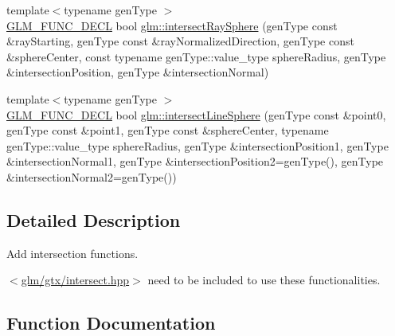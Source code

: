 \begin{DoxyCompactItemize}
\item 
{\footnotesize template$<$typename gen\+Type $>$ }\\\mbox{\hyperlink{setup_8hpp_ab2d052de21a70539923e9bcbf6e83a51}{G\+L\+M\+\_\+\+F\+U\+N\+C\+\_\+\+D\+E\+CL}} bool \mbox{\hyperlink{group__gtx__intersect_gad28c00515b823b579c608aafa1100c1d}{glm\+::intersect\+Ray\+Sphere}} (gen\+Type const \&ray\+Starting, gen\+Type const \&ray\+Normalized\+Direction, gen\+Type const \&sphere\+Center, const typename gen\+Type\+::value\+\_\+type sphere\+Radius, gen\+Type \&intersection\+Position, gen\+Type \&intersection\+Normal)
\item 
{\footnotesize template$<$typename gen\+Type $>$ }\\\mbox{\hyperlink{setup_8hpp_ab2d052de21a70539923e9bcbf6e83a51}{G\+L\+M\+\_\+\+F\+U\+N\+C\+\_\+\+D\+E\+CL}} bool \mbox{\hyperlink{group__gtx__intersect_ga9c68139f3d8a4f3d7fe45f9dbc0de5b7}{glm\+::intersect\+Line\+Sphere}} (gen\+Type const \&point0, gen\+Type const \&point1, gen\+Type const \&sphere\+Center, typename gen\+Type\+::value\+\_\+type sphere\+Radius, gen\+Type \&intersection\+Position1, gen\+Type \&intersection\+Normal1, gen\+Type \&intersection\+Position2=gen\+Type(), gen\+Type \&intersection\+Normal2=gen\+Type())
\end{DoxyCompactItemize}


\subsection{Detailed Description}
Add intersection functions. 

$<$\mbox{\hyperlink{intersect_8hpp}{glm/gtx/intersect.\+hpp}}$>$ need to be included to use these functionalities. 

\subsection{Function Documentation}
\mbox{\label{group__gtx__intersect_ga9c68139f3d8a4f3d7fe45f9dbc0de5b7}} 

